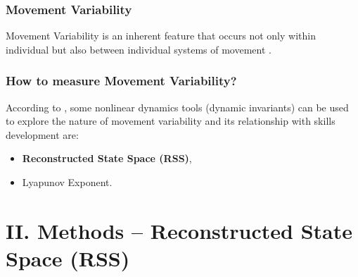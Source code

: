 \documentclass{beamer}
\begin{document}
\begin{frame}
\frametitle{Movement Variability}

Movement Variability is an inherent feature that occurs not only within individual
but also between individual systems of movement  \textcolor{red}{\textbf{ \cite{newell1993variability}   }}.

\end{frame}




\begin{frame}
\frametitle{How to measure Movement Variability?}


According to \textcolor{red}{\textbf{  \cite{Preatoni2013}   }},
some nonlinear dynamics tools (dynamic invariants)
can be used to explore the nature of movement variability
and its relationship with skills development are:
\begin{itemize}
    \item \textbf{Reconstructed State Space (RSS)},
    \item Lyapunov Exponent.
\end{itemize}


\end{frame}













\section{II. Methods --  Reconstructed State Space (RSS)}



\end{document}
